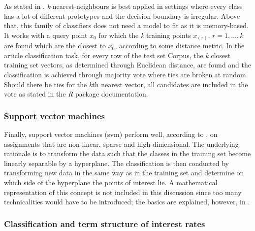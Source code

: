 As stated in \textcite[p.~465]{Friedman.2001}, \textit{k}-nearest-neighbours is best applied in settings where every class has a lot of different prototypes and the decision boundary is irregular. Above that, this family of classifiers does not need a model to fit as it is memory-based. It works with a query point $x_0$ for which the \textit{k} training points $x_{(r)},\, r=1,\dots,k$ are found which are the closest to $x_0$, according to some distance metric. In the article classification task, for every row of the test set Corpus, the \textit{k} closest training set vectors, as determined through Euclidean distance, are found and the classification is achieved through majority vote where ties are broken at random. Should there be ties for the \textit{k}th nearest vector, all candidates are included in the vote as stated in the \textit{R} package documentation. 


\subsubsection{Support vector machines} %

Finally, support vector machines (svm) perform well, according to \textcite[p.~293]{Williams.2011}, on assignments that are non-linear, sparse and high-dimensional. The underlying rationale is to transform the data such that the classes in the training set become linearly separable by a hyperplane. The classification is then conducted by transforming new data in the same way as in the training set and determine on which side of the hyperplane the points of interest lie. A mathematical representation of this concept is not included in this discussion since too many technicalities would have to be introduced; the basics are explained, however, in \textcite[p.~417]{Friedman.2001}. 

%
\subsubsection{Classification and term structure of interest rates}

